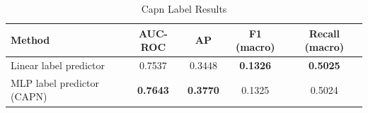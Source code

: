 \begin{table}[ht]
\centering
\caption{Capn Label Results}
\label{tab:capn_label}
\begin{tabular}{lcccc}
\toprule
Method & AUC-ROC & AP & F1 (macro) & Recall (macro) \\
\midrule
Linear label predictor & 0.7537 & 0.3448 & \textbf{0.1326} & \textbf{0.5025} \\
MLP label predictor (CAPN) & \textbf{0.7643} & \textbf{0.3770} & 0.1325 & 0.5024 \\
\bottomrule
\end{tabular}
\end{table}